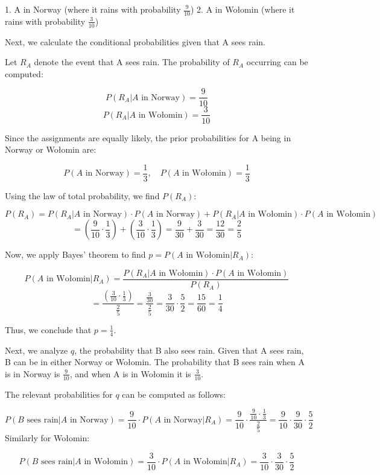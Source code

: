 \documentclass{article}
\begin{document}
1. A in Norway (where it rains with probability \( \frac{9}{10} \))
2. A in Wołomin (where it rains with probability \( \frac{3}{10} \))

Next, we calculate the conditional probabilities given that A sees rain.

Let \( R_A \) denote the event that A sees rain. The probability of \( R_A \) occurring can be computed:

\[
P(R_A | A \text{ in Norway}) = \frac{9}{10}
\]
\[
P(R_A | A \text{ in Wołomin}) = \frac{3}{10}
\]

Since the assignments are equally likely, the prior probabilities for A being in Norway or Wołomin are:

\[
P(A \text{ in Norway}) = \frac{1}{3}, \quad P(A \text{ in Wołomin}) = \frac{1}{3}
\]

Using the law of total probability, we find \( P(R_A) \):

\[
P(R_A) = P(R_A | A \text{ in Norway}) \cdot P(A \text{ in Norway}) + P(R_A | A \text{ in Wołomin}) \cdot P(A \text{ in Wołomin}) 
\]
\[
= \left( \frac{9}{10} \cdot \frac{1}{3} \right) + \left( \frac{3}{10} \cdot \frac{1}{3} \right) = \frac{9}{30} + \frac{3}{30} = \frac{12}{30} = \frac{2}{5}
\]

Now, we apply Bayes' theorem to find \( p = P(A \text{ in Wołomin} | R_A) \):

\[
P(A \text{ in Wołomin} | R_A) = \frac{P(R_A | A \text{ in Wołomin}) \cdot P(A \text{ in Wołomin})}{P(R_A)}
\]
\[
= \frac{\left( \frac{3}{10} \cdot \frac{1}{3} \right)}{\frac{2}{5}} = \frac{\frac{3}{30}}{\frac{2}{5}} = \frac{3}{30} \cdot \frac{5}{2} = \frac{15}{60} = \frac{1}{4}
\]

Thus, we conclude that \( p = \frac{1}{4} \).

Next, we analyze \( q \), the probability that B also sees rain. Given that A sees rain, B can be in either Norway or Wołomin. The probability that B sees rain when A is in Norway is \( \frac{9}{10} \), and when A is in Wołomin it is \( \frac{3}{10} \).

The relevant probabilities for \( q \) can be computed as follows:

\[
P(B \text{ sees rain} | A \text{ in Norway}) = \frac{9}{10} \cdot P(A \text{ in Norway} | R_A) = \frac{9}{10} \cdot \frac{\frac{9}{10} \cdot \frac{1}{3}}{\frac{2}{5}} = \frac{9}{10} \cdot \frac{9}{30} \cdot \frac{5}{2}
\]
Similarly for Wołomin:

\[
P(B \text{ sees rain} | A \text{ in Wołomin}) = \frac{3}{10} \cdot P(A \text{ in Wołomin} | R_A) = \frac{3}{10} \cdot \frac{3}{30} \cdot \frac{5}{2}
\]
\end{document}
